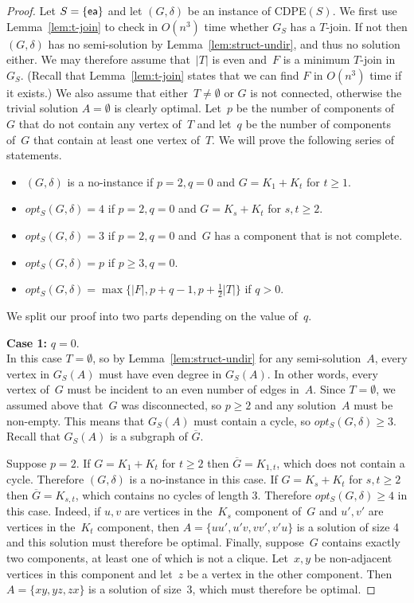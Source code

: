 \documentclass[11pt]{llncs}
\newcommand{\opts}{opt_S}
\newcommand{\ea}{{\sf ea}}
\newcommand{\cdpe}{{\sc CDPE}}
\newcommand\displaycase[1]{{\bf #1}}
\begin{document}
\begin{proof}
Let $S=\{\ea\}$ and let $(G,\delta)$ be an instance of \cdpe$(S)$.  We first
use Lemma~\ref{lem:t-join} to check in $O(n^3)$ time whether $G_S$ has a
$T$-join.  If not then $(G,\delta)$ has no semi-solution by
Lemma~\ref{lem:struct-undir}, and thus no solution either.  We may therefore
assume that~$|T|$ is even and~$F$ is a minimum $T$-join in~$G_S$. (Recall that
Lemma~\ref{lem:t-join} states that we can find $F$ in $O(n^3)$ time if it
exists.) We also assume that either~$T \neq \emptyset$ or $G$ is not connected,
otherwise the trivial solution $A=\emptyset$ is clearly optimal.  Let~$p$ be
the number of components of~$G$ that do not contain any vertex of~$T$ and
let~$q$ be the number of components of~$G$ that contain at least one vertex
of~$T$. We will prove the following series of statements.

\begin{itemize}
\item $(G,\delta)$ is a no-instance if $p=2,q=0$ and $G=K_1+K_t$ for $t\geq 1$.
\item $\opts(G,\delta)=4$ if $p=2,q=0$ and $G=K_s+K_t$ for $s,t\geq 2$.
\item $\opts(G,\delta)=3$ if $p=2,q=0$ and~$G$ has a component that is not complete.
\item $\opts(G,\delta)=p$ if $p\geq 3,q=0$.
\item $\opts(G,\delta)=\max\{|F|,p+q-1,p+\frac{1}{2}|T|\}$ if $q>0$.
\end{itemize}

We split our proof into two parts depending on the value of~$q$.

\medskip
\noindent
\displaycase{Case 1:} $q=0$.\\
In this case $T=\emptyset$, so by Lemma~\ref{lem:struct-undir} for any
semi-solution~$A$, every vertex in $G_S(A)$ must have even degree in $G_S(A)$.
In other words, every vertex of~$G$ must be incident to an even number of edges
in~$A$. Since $T=\emptyset$, we assumed above that~$G$ was disconnected, so $p\geq 2$
and any solution~$A$ must be non-empty. This means that $G_S(A)$ must contain a
cycle, so $\opts(G,\delta)\geq 3$. Recall that $G_S(A)$ is
a subgraph of $\overline{G}$.

Suppose $p=2$. If $G=K_1+K_t$ for $t\geq 2$ then $\overline{G}=K_{1,t}$, which
does not contain a cycle. Therefore $(G,\delta)$ is a no-instance in this case.
If $G=K_s+K_t$ for $s,t\geq 2$ then $\overline{G}=K_{s,t}$, which contains no
cycles of length 3. Therefore $\opts(G,\delta)\geq 4$ in this case.  Indeed, if
$u,v$ are vertices in the~$K_s$ component of~$G$ and $u',v'$ are vertices in the~$K_t$
component, then $A=\{uu',u'v,vv',v'u\}$ is a solution of size 4 and this
solution must therefore be optimal.  Finally, suppose~$G$ contains exactly two
components, at least one of which is not a clique. Let~$x,y$ be non-adjacent
vertices in this component and let~$z$ be a vertex in the other component. Then
$A=\{xy,yz,zx\}$ is a solution of size~3, which must therefore be optimal.


\end{proof}
\end{document}

